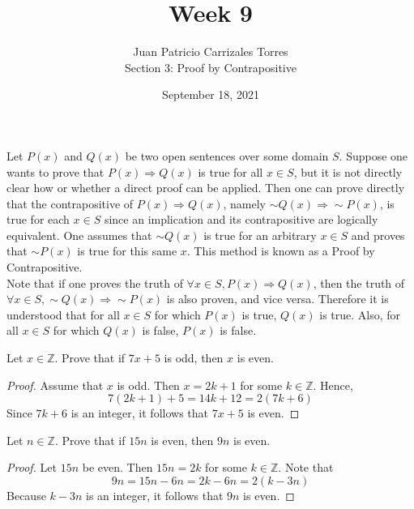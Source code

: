 \documentclass[12pt]{article}
\newcommand{\Z}{\mathbb{Z}}
\newenvironment{problem}[2][Problem]{\begin{trivlist}
		\item[\hskip \labelsep {\bfseries #1}\hskip \labelsep {\bfseries #2.}]}{\end{trivlist}}
\begin{document}
	
	\title{Week 9}
	\author{Juan Patricio Carrizales Torres \\
		Section 3: Proof by Contrapositive}
	\date{September 18, 2021}
	\maketitle
	 
	Let $P(x)$ and $Q(x)$ be two open sentences over some domain $S$. Suppose one wants to prove that $P(x)\Rightarrow Q(x)$ is true for all $x\in S$, but it is not directly clear how or whether a direct proof can be applied. Then one can prove directly that the contrapositive of $P(x)\Rightarrow Q(x)$, namely $\sim Q(x) \Rightarrow \sim P(x)$, is true for each $x \in S$ since an implication and its contrapositive are logically equivalent. One assumes that $\sim Q(x)$ is true for an arbitrary $x\in S$ and proves that $\sim P(x)$ is true for this same $x$. This method is known as a Proof by Contrapositive.\\
	Note that if one proves the truth of $\forall x\in S, P(x)\Rightarrow Q(x)$, then the truth of $\forall x\in S, \sim Q(x)\Rightarrow \sim P(x)$ is also proven, and vice versa. Therefore it is understood that for all $x\in S$ for which $P(x)$ is true, $Q(x)$ is true. Also, for all $x \in S$ for which $Q(x)$ is false, $P(x)$ is false.
	\begin{problem}{16}
		Let $x\in \Z$. Prove that if $7x+5$ is odd, then $x$ is even.
		\begin{proof}
			Assume that $x$ is odd. Then $x=2k+1$ for some $k\in \Z$. Hence,
			\begin{equation*}
				7(2k+1)+5=14k+12=2(7k+6)
			\end{equation*}
		Since $7k+6$ is an integer, it follows that $7x+5$ is even.
		\end{proof}
	\end{problem}

	\begin{problem}{17}
		Let $n\in \Z$. Prove that if $15n$ is even, then $9n$ is even.
		\begin{proof}
			Let $15n$ be even. Then $15n = 2k$ for some $k\in \Z$. Note that
			\begin{equation*}
				9n = 15n-6n= 2k-6n = 2(k-3n)
			\end{equation*} 
		Because $k-3n$ is an integer, it follows that $9n$ is even.
		\end{proof}
	\end{problem}
\end{document}
